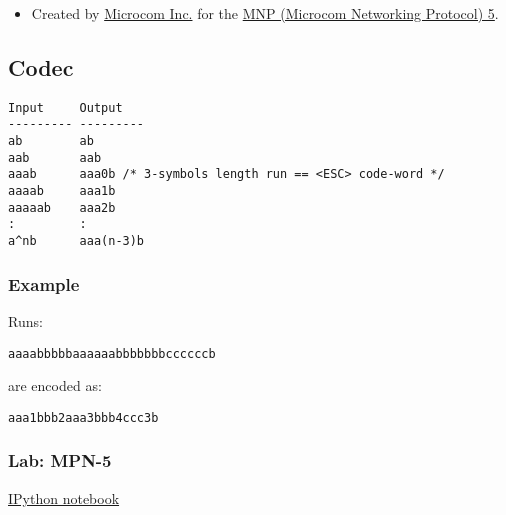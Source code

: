 \begin{itemize}
\tightlist
\item
  Created by
  \href{https://en.wikipedia.org/wiki/Microcom_Networking_Protocol}{Microcom
  Inc.} for the
  \href{https://scholar.google.es/scholar?hl=es\&as_sdt=0\%2C5\&q=held+data+compression+techniques+applications\&btnG=}{MNP
  (Microcom Networking Protocol) 5}.
\end{itemize}

\subsection{Codec}

\begin{verbatim}
Input     Output
--------- ---------
ab        ab
aab       aab
aaab      aaa0b /* 3-symbols length run == <ESC> code-word */
aaaab     aaa1b
aaaaab    aaa2b
:         :
a^nb      aaa(n-3)b
\end{verbatim}

    \hypertarget{example}{%
\subsubsection{Example}\label{example}}

Runs:

\begin{verbatim}
aaaabbbbbaaaaaabbbbbbbccccccb
\end{verbatim}

are encoded as:

\begin{verbatim}
aaa1bbb2aaa3bbb4ccc3b
\end{verbatim}

\subsubsection{Lab: MPN-5}
\href{https://nbviewer.jupyter.org/github/vicente-gonzalez-ruiz/Run-length_encoding/blob/master/MPN-5.ipynb}{IPython notebook}
